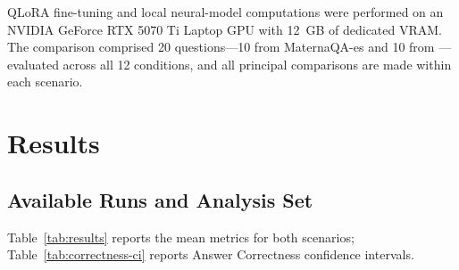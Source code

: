 QLoRA fine-tuning and local neural-model computations were performed on an
NVIDIA GeForce RTX 5070 Ti Laptop GPU with 12~GB of dedicated VRAM.
The comparison comprised 20 questions---10 from MaternaQA-es and 10 from
---evaluated across all 12 conditions, and all principal
comparisons are made within each scenario.

\section{Results}
\subsection{Available Runs and Analysis Set}
Table~\ref{tab:results} reports the mean metrics for both scenarios;
Table~\ref{tab:correctness-ci} reports Answer Correctness confidence intervals.

